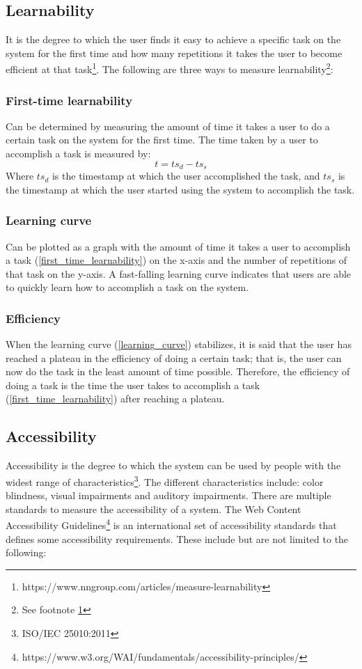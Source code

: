 \documentclass[11pt,a4paper]{article}
\def \iso{\footnote{ISO/IEC 25010:2011}}
\begin{document}
\subsection{Learnability}
It is the degree to which the user finds it easy to achieve a specific task on the system for the first time and
how many repetitions it takes the user to become efficient at that
task\footnote{\label{measure_learnability}https://www.nngroup.com/articles/measure-learnability}.
The following are three ways to measure
learnability\footnote{See footnote \ref{measure_learnability}}:

\subsubsection{\label{first_time_learnability}First-time learnability}
Can be determined by measuring the amount of time it takes a user to do a certain task on the system for the first time.
The time taken by a user to accomplish a task is measured by:
\[t = ts_d - ts_s\]
Where $ts_d$ is the timestamp at which the user accomplished the task,
and $ts_s$ is the timestamp at which the user started using the system to accomplish the task.

\subsubsection{\label{learning_curve}Learning curve}
Can be plotted as a graph with the amount of time it takes a user to accomplish a
task (\ref{first_time_learnability}) on the x-axis and the number of repetitions of that task on the y-axis.
A fast-falling learning curve indicates that users are able to quickly learn how to accomplish a task on the system.

\subsubsection{Efficiency}
When the learning curve (\ref{learning_curve}) stabilizes,
it is said that the user has reached a plateau in the efficiency of doing a certain task;
that is, the user can now do the task in the least amount of time possible.
Therefore, the efficiency of doing a task is the time the user takes to accomplish a task (\ref{first_time_learnability})
after reaching a plateau.

\subsection{Accessibility}
Accessibility is the degree to which the system can be used by people with the widest range of characteristics\iso.
The different characteristics include: color blindness, visual impairments and auditory impairments.
There are multiple standards to measure the accessibility of a system.
The Web Content Accessibility Guidelines\footnote{https://www.w3.org/WAI/fundamentals/accessibility-principles/}
is an international set of accessibility standards that defines some accessibility requirements.
These include but are not limited to the following:
\end{document}
